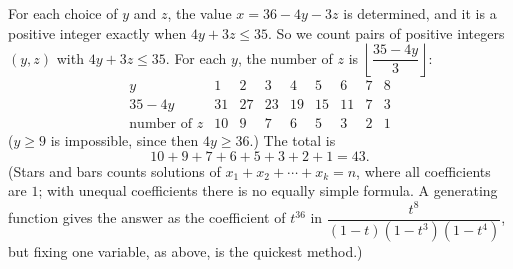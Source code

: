 For each choice of $y$ and $z$, the value $x=36-4y-3z$ is determined, and it is a positive integer exactly when $4y+3z\le35$. So we count pairs of positive integers $(y,z)$ with $4y+3z\le35$. For each $y$, the number of $z$ is $\left\lfloor\dfrac{35-4y}{3}\right\rfloor$:
\[
\begin{array}{c|cccccccc}
y&1&2&3&4&5&6&7&8\\\hline
35-4y&31&27&23&19&15&11&7&3\\
\text{number of }z&10&9&7&6&5&3&2&1
\end{array}
\]
($y\ge9$ is impossible, since then $4y\ge36$.) The total is
\[10+9+7+6+5+3+2+1=\boxed{43}.\]
(Stars and bars counts solutions of $x_1+x_2+\cdots+x_k=n$, where all coefficients are $1$; with unequal coefficients there is no equally simple formula. A generating function gives the answer as the coefficient of $t^{36}$ in $\dfrac{t^{8}}{(1-t)\left(1-t^3\right)\left(1-t^4\right)}$, but fixing one variable, as above, is the quickest method.)
